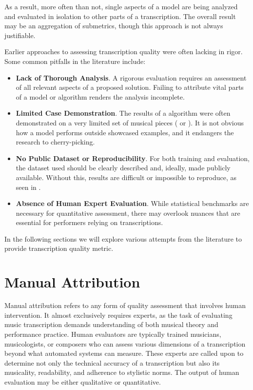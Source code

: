 As a result, more often than not, single aspects of a model are being analyzed and evaluated in isolation to other parts of a transcription. The overall result may be an aggregation of submetrics, though this approach is not always justifiable.

Earlier approaches to assessing transcription quality were often lacking in rigor. Some common pitfalls in the literature include:\begin{itemize}
	\item {\bf Lack of Thorough Analysis}. A rigorous evaluation requires an assessment of all relevant aspects of a proposed solution. Failing to attribute vital parts of a model or algorithm renders the analysis incomplete.
	\item {\bf Limited Case Demonstration}. The results of a algorithm were often demonstrated on a very limited set of musical pieces (\cite{Takeda2002} or \cite{Yang2005}). It is not obvious how a model performs outside showcased examples, and it endangers the research to cherry-picking.
	\item {\bf No Public Dataset or Reproducibility}. For both training and evaluation, the dataset used should be clearly described and, ideally, made publicly available. Without this, results are difficult or impossible to reproduce, as seen in \cite{Takeda2002}.
	\item {\bf Absence of Human Expert Evaluation}. While statistical benchmarks are necessary for quantitative assessment, there may overlook nuances that are essential for performers relying on transcriptions. 
\end{itemize} 

In the following sections we will explore various attempts from the literature to provide transcription quality metric.

\section{Manual Attribution}

Manual attribution refers to any form of quality assessment that involves human intervention. It almost exclusively requires experts, as the task of evaluating music transcription demands understanding of both musical theory and performance practice. Human evaluators are typically trained musicians, musicologists, or composers who can assess various dimensions of a transcription beyond what automated systems can measure. These experts are called upon to determine not only the technical accuracy of a transcription but also its musicality, readability, and adherence to stylistic norms. The output of human evaluation may be either qualitative or quantitative. 

